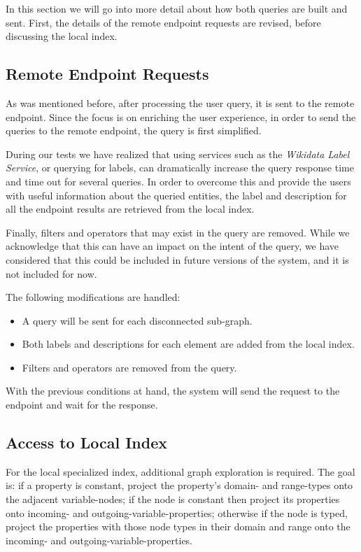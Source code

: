 In this section we will go into more detail about how both queries are built and sent. First, the details of the remote endpoint requests are revised, before discussing the local index.

\subsection{Remote Endpoint Requests}

As was mentioned before, after processing the user query, it is sent to the remote endpoint. Since the focus is on enriching the user experience, in order to send the queries to the remote endpoint, the query is first simplified.

During our tests we have realized that using services such as the \textit{Wikidata Label Service}, or querying for labels, can dramatically increase the query response time and time out for several queries. In order to overcome this and provide the users with useful information about the queried entities, the label and description for all the endpoint results are retrieved from the local index.

Finally, filters and operators that may exist in the query are removed. While we acknowledge that this can have an impact on the intent of the query, we have considered that this could be included in future versions of the system, and it is not included for now.

The following modifications are handled:
\begin{itemize}
    \item A query will be sent for each disconnected sub-graph.
    \item Both labels and descriptions for each element are added from the local index.
    \item Filters and operators are removed from the query.
\end{itemize}

With the previous conditions at hand, the system will send the request to the endpoint and wait for the response.

\subsection{Access to Local Index}

For the local specialized index, additional graph exploration is required. The goal is: if a property is constant, project the property's domain- and range-types onto the adjacent variable-nodes; if the node is constant then project its properties onto incoming- and outgoing-variable-properties; otherwise if the node is typed, project the properties with those node types in their domain and range onto the incoming- and outgoing-variable-properties.

